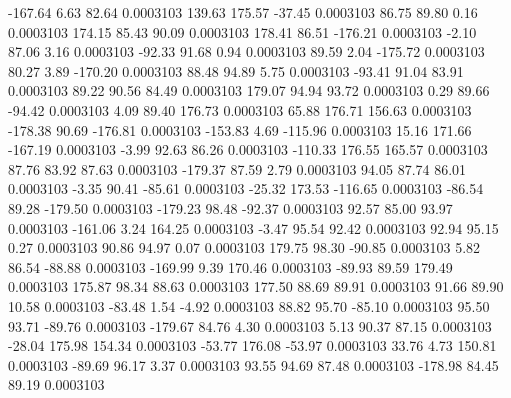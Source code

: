      -167.64        6.63       82.64     0.0003103
      139.63      175.57      -37.45     0.0003103
       86.75       89.80        0.16     0.0003103
      174.15       85.43       90.09     0.0003103
      178.41       86.51     -176.21     0.0003103
       -2.10       87.06        3.16     0.0003103
      -92.33       91.68        0.94     0.0003103
       89.59        2.04     -175.72     0.0003103
       80.27        3.89     -170.20     0.0003103
       88.48       94.89        5.75     0.0003103
      -93.41       91.04       83.91     0.0003103
       89.22       90.56       84.49     0.0003103
      179.07       94.94       93.72     0.0003103
        0.29       89.66      -94.42     0.0003103
        4.09       89.40      176.73     0.0003103
       65.88      176.71      156.63     0.0003103
     -178.38       90.69     -176.81     0.0003103
     -153.83        4.69     -115.96     0.0003103
       15.16      171.66     -167.19     0.0003103
       -3.99       92.63       86.26     0.0003103
     -110.33      176.55      165.57     0.0003103
       87.76       83.92       87.63     0.0003103
     -179.37       87.59        2.79     0.0003103
       94.05       87.74       86.01     0.0003103
       -3.35       90.41      -85.61     0.0003103
      -25.32      173.53     -116.65     0.0003103
      -86.54       89.28     -179.50     0.0003103
     -179.23       98.48      -92.37     0.0003103
       92.57       85.00       93.97     0.0003103
     -161.06        3.24      164.25     0.0003103
       -3.47       95.54       92.42     0.0003103
       92.94       95.15        0.27     0.0003103
       90.86       94.97        0.07     0.0003103
      179.75       98.30      -90.85     0.0003103
        5.82       86.54      -88.88     0.0003103
     -169.99        9.39      170.46     0.0003103
      -89.93       89.59      179.49     0.0003103
      175.87       98.34       88.63     0.0003103
      177.50       88.69       89.91     0.0003103
       91.66       89.90       10.58     0.0003103
      -83.48        1.54       -4.92     0.0003103
       88.82       95.70      -85.10     0.0003103
       95.50       93.71      -89.76     0.0003103
     -179.67       84.76        4.30     0.0003103
        5.13       90.37       87.15     0.0003103
      -28.04      175.98      154.34     0.0003103
      -53.77      176.08      -53.97     0.0003103
       33.76        4.73      150.81     0.0003103
      -89.69       96.17        3.37     0.0003103
       93.55       94.69       87.48     0.0003103
     -178.98       84.45       89.19     0.0003103
